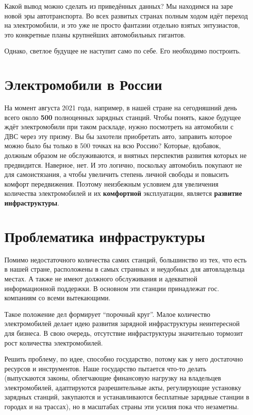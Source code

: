\documentclass[a4paper,12pt]{report}
\begin{document}
Какой вывод можно сделать из приведённых данных? Мы находимся на заре новой эры автотранспорта. Во всех развитых странах полным ходом идёт переход на электромобили, и это уже не просто фантазии отдельно взятых энтузиастов, это конкретные планы крупнейших автомобильных гигантов. 

Однако, светлое будущее не наступит само по себе. Его необходимо построить. 

\section{Электромобили в России}
На момент августа 2021 года, например, в нашей стране на сегодняшний день всего около \textbf{500} полноценных зарядных станций. Чтобы понять, какое будущее ждёт электромобили при таком раскладе, нужно посмотреть на автомобили с ДВС через эту призму. Вы бы захотели приобретать авто, заправить которое можно было бы только в 500 точках на всю Россию? Которые, вдобавок, должным образом не обслуживаются, и внятных перспектив развития которых не предвидится. Наверное, нет. И это логично, поскольку автомобиль покупают не для самоистязания, а чтобы увеличить степень личной свободы и повысить комфорт передвижения. Поэтому неизбежным условием для увеличения количества электромобилей и их \textbf{комфортной} эксплуатации, является \textbf{развитие инфраструктуры}. 

\section{Проблематика инфраструктуры}
Помимо недостаточного количества самих станций, большинство из тех, что есть в нашей стране, расположены в самых странных и неудобных для автовладельца местах. А также не имеют должного обслуживания и адекватной информационной поддержки. В основном эти станции принадлежат гос. компаниям со всеми вытекающими.

Такое положение дел формирует “порочный круг”. Малое количество электромобилей делает идею развития зарядной инфраструктуры неинтересной для бизнеса. В свою очередь, отсутствие инфраструктуры значительно тормозит рост количества электромобилей. 

Решить проблему, по идее, способно государство, потому как у него достаточно ресурсов и инструментов. Наше государство пытается что-то делать (выпускаются законы, облегчающие финансовую нагрузку на владельцев электромобилей, адаптируются разрешительные акты, регулирующие установку зарядных станций, закупаются и устанавливаются бесплатные зарядные станции в городах и на трассах), но в масштабах страны эти усилия пока что незаметны. 
\end{document}
